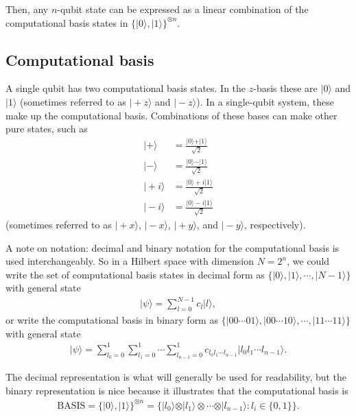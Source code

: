 \documentclass[11pt]{article}
\begin{document}
Then, any $n$-qubit state can be expressed as a linear combination of the computational basis states in $\{\vert 0 \rangle, \vert 1 \rangle\}^{\otimes n}$.

\subsection{Computational basis}

A single qubit has two computational basis states. In the $z$-basis these are $\vert 0 \rangle$ and $\vert 1 \rangle$ (sometimes referred to as $\vert +z \rangle$ and $\vert -z \rangle$). In a single-qubit system, these make up the computational basis. Combinations of these bases can make other pure states, such as
\begin{align*}
\vert + \rangle &= \frac{\vert 0 \rangle + \vert 1 \rangle}{\sqrt{2}} \\
\vert - \rangle &= \frac{\vert 0 \rangle - \vert 1 \rangle}{\sqrt{2}} \\
\vert +i \rangle &= \frac{\vert 0 \rangle + i\vert 1 \rangle}{\sqrt{2}} \\
\vert -i \rangle &= \frac{\vert 0 \rangle - i\vert 1 \rangle}{\sqrt{2}}
\end{align*}
(sometimes referred to as $\vert +x \rangle$, $\vert -x \rangle$, $\vert +y \rangle$, and $\vert -y \rangle$, respectively).

A note on notation: decimal and binary notation for the computational basis is used interchangeably. So in a Hilbert space with dimension $N = 2^n$, we could write the set of computational basis states in decimal form as $\{\vert 0 \rangle, \vert 1 \rangle, \cdots, \vert N-1 \rangle \}$ with general state
\begin{align*}
\vert \psi \rangle = \sum_{l=0}^{N-1} c_l \vert l \rangle,
\end{align*}
or write the computational basis in binary form as $\{ \vert 00\cdots 01\rangle, \vert 00\cdots 10\rangle, \cdots, \vert 11 \cdots 11\rangle \}$ with general state
\begin{align*}
\vert \psi \rangle = \sum_{l_0 = 0}^{1} \sum_{l_1 = 0}^{1} \cdots \sum_{l_{n-1} = 0}^{1} c_{l_0 l_1 \cdots l_{n-1}} \vert l_0 l_1 \cdots l_{n-1} \rangle.
\end{align*}

The decimal representation is what will generally be used for readability, but the binary representation is nice because it illustrates that the computational basis is
\begin{align*}
\text{BASIS} = \{\vert 0 \rangle, \vert 1 \rangle\}^{\otimes n}
= \{ \vert l_0 \rangle \otimes \vert l_1 \rangle \otimes \cdots \otimes \vert l_{n-1} \rangle : l_i \in \{0, 1\}\}.
\end{align*}
\end{document}
